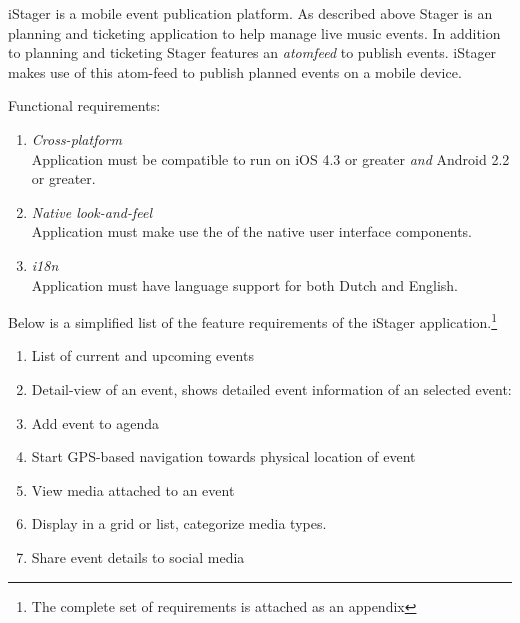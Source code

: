 iStager is a mobile event publication platform. As described above Stager is an planning and ticketing application to help manage live music events. In addition to planning and ticketing Stager features an \emph{atomfeed} to publish events. iStager makes use of this atom-feed to publish planned events on a mobile device.




Functional requirements:
\begin{enumerate}
\item \emph{Cross-platform}\\Application must be compatible to run on iOS 4.3 or greater \emph{and} Android 2.2 or greater.
\item \emph{Native look-and-feel}\\Application must make use the of the native user interface components.
\item \emph{i18n}\\Application must have language support for both Dutch and English.
\end{enumerate}

\noindent Below is a simplified list of the feature requirements of the iStager application.\footnote{The complete set of requirements is attached as an appendix} %
\begin{enumerate}
\item
List of current and upcoming events
\item
Detail-view of an event, shows detailed event information of an selected event:
\item
Add event to agenda
\item
Start GPS-based navigation towards physical location of event
\item
View media attached to an event
\item
Display in a grid or list, categorize media types.
\item
Share event details to social media
\end{enumerate}

